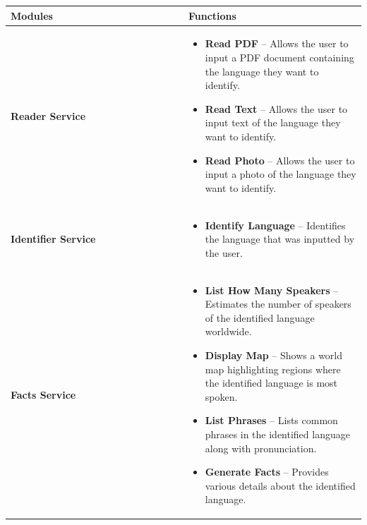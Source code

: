 \begin{longtable}{p{0.5\linewidth} | p{0.5\linewidth}}
\toprule
\textbf{Modules} & \textbf{Functions} \\
\midrule
\endhead

\textbf{Reader Service} & 
\begin{itemize}
    \item \textbf{Read PDF} – Allows the user to input a PDF document containing the language they want to identify.
    \item \textbf{Read Text} – Allows the user to input text of the language they want to identify.
    \item \textbf{Read Photo} – Allows the user to input a photo of the language they want to identify.
\end{itemize} \\

\hline

\textbf{Identifier Service} & 
\begin{itemize}
    \item \textbf{Identify Language} – Identifies the language that was inputted by the user.
\end{itemize} \\


\hline

\textbf{Facts Service} & 
\begin{itemize}
    \item \textbf{List How Many Speakers} – Estimates the number of speakers of the identified language worldwide.
    \item \textbf{Display Map} – Shows a world map highlighting regions where the identified language is most spoken.
    \item \textbf{List Phrases} – Lists common phrases in the identified language along with pronunciation.
    \item \textbf{Generate Facts} – Provides various details about the identified language.
\end{itemize} \\
\bottomrule
\end{longtable}


